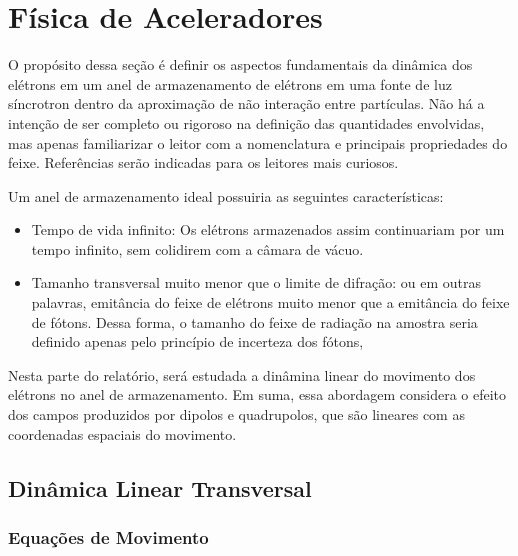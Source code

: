 \chapter{Física de Aceleradores}

O propósito dessa seção é definir os aspectos fundamentais da dinâmica dos elétrons em um anel de armazenamento de elétrons em uma fonte de luz síncrotron dentro da aproximação de não interação entre partículas. Não há a intenção de ser completo ou rigoroso na definição das quantidades envolvidas, mas apenas familiarizar o leitor com a nomenclatura e principais propriedades do feixe. Referências serão indicadas para os leitores mais curiosos.

Um anel de armazenamento ideal possuiria as seguintes características:
\begin{itemize}
 \item Tempo de vida infinito: Os elétrons armazenados assim continuariam por um tempo infinito, sem colidirem com a câmara de vácuo.
 \item Tamanho transversal muito menor que o limite de difração: ou em outras palavras, emitância do feixe de elétrons muito menor que a emitância do feixe de fótons. Dessa forma, o tamanho do feixe de radiação na amostra seria definido apenas pelo princípio de incerteza dos fótons,
\end{itemize}

Nesta parte do relatório, será estudada a dinâmina linear do movimento dos elétrons no anel de armazenamento. Em suma, essa abordagem considera o efeito dos campos produzidos por dipolos e quadrupolos, que são lineares com as coordenadas espaciais do movimento.

\section{Dinâmica Linear Transversal}

\subsection{Equações de Movimento}

